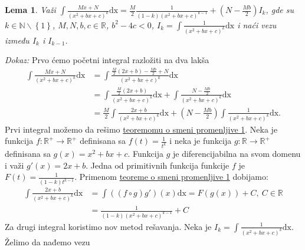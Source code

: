 \documentclass{article}
\newtheorem{lema}{Lema}[section]
\begin{document}
\begin{lemabox}
    \label{lema_1.4}
    \begin{lema}
        Važi $\displaystyle\int \frac{Mx+N}{\left(x^2+bx+c\right)^k}\text{dx}=\frac{M}{2}\frac{1}{\left(1-k\right)\left(x^2+bx+c\right)^{k-1}}+\left(N-\frac{Mb}{2}\right)I_k$, gde su $k\in\mathbb{N}\backslash\left\{1\right\}$,
        $M,N,b,c\in\mathbb{R}$, $b^2 - 4c < 0$, $\displaystyle I_k=\int\frac{1}{\left(x^2+bx+c\right)^k}\text{dx}$ i naći vezu između $I_k$ i $I_{k-1}$.
    \end{lema}
\end{lemabox}

\textit{Dokaz:} Prvo ćemo početni integral razložiti na dva lakša
\begin{align*}
    \int \frac{Mx+N}{\left(x^2+bx+c\right)^k}\text{dx} & =\int \frac{\frac{M}{2}\left(2x+b\right)-\frac{Mb}{2}+N}{\left(x^2+bx+c\right)^k}\text{dx}                                                \\
                                                       & =\int \frac{\frac{M}{2}\left(2x+b\right)}{\left(x^2+bx+c\right)^k}\text{dx}+\int\frac{N-\frac{Mb}{2}}{\left(x^2+bx+c\right)^k}\text{dx}   \\
                                                       & =\frac{M}{2}\int \frac{2x+b}{\left(x^2+bx+c\right)^k}\text{dx}+\left(N-\frac{Mb}{2}\right)\int\frac{1}{\left(x^2+bx+c\right)^k}\text{dx}.
\end{align*}
Prvi integral možemo da rešimo \hyperref[teorema_1.2]{teoremomu o smeni promenljive 1}. Neka je
funkcija $f: \mathbb{R}^{+}\longrightarrow\mathbb{R}^{+}$ definisana sa
$\displaystyle f\left(t\right)=\frac{1}{t^k}$ i neka je funkcija $g: \mathbb{R}\longrightarrow\mathbb{R}^{+}$
definisana sa $g\left(x\right)=x^2+bx+c$. Funkcija $g$ je diferencijabilna na svom domenu
i važi $g'\left(x\right)=2x+b$. Jedna od primitivnih funkcija funkcije $f$ je $\displaystyle F\left(t\right)=\frac{1}{\left(1-k\right)t^{k-1}}$.
Primenom \hyperref[teorema_1.2]{teoreme o smeni promenljive 1} dobijamo:
\begin{align*}
    \int \frac{2x+b}{\left(x^2+bx+c\right)^k}\text{dx} & =\int\left(\left(f\circ g\right)g'\right)\left(x\right)\text{dx}=F\left(g\left(x\right)\right)+C,\ C\in\mathbb{R} \\
                                                       & =\frac{1}{\left(1-k\right)\left(x^2+bx+c\right)^{k-1}}+C
\end{align*}
Za drugi integral koristimo nov metod rešavanja.
Neka je $\displaystyle I_k=\int\frac{1}{\left(x^2+bx+c\right)^k}\text{dx}$. Želimo da nađemo vezu
\end{document}
